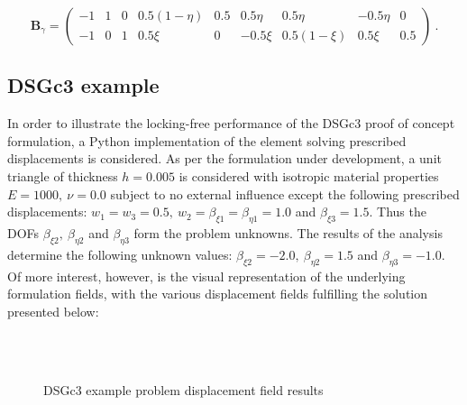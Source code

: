 \begin{equation} 
\mathbf{B}_\gamma = 
\begin{pmatrix}
-1 & 1 & 0 & 0.5(1 - \eta) & 0.5 & 0.5\eta & 0.5\eta & -0.5\eta & 0 \\
-1 & 0 & 1 & 0.5\xi & 0 & -0.5\xi & 0.5(1-\xi) & 0.5\xi & 0.5
\end{pmatrix}
\label{eqDSGc3_26}\ .
\end{equation}

\subsection{DSGc3 example}
In order to illustrate the locking-free performance of the DSGc3 proof of concept formulation, a Python implementation of the element solving prescribed displacements is considered. As per the formulation under development, a unit triangle of thickness $h = 0.005$ is considered with isotropic material properties $E = 1000,\ \nu=0.0$ subject to no external influence except the following prescribed displacements: $w_1 = w_3 = 0.5,\ w_2 = \beta_{\xi 1} = \beta_{\eta 1} = 1.0$ and $\beta_{\xi 3} = 1.5$. Thus the DOFs $\beta_{\xi 2},\ \beta_{\eta 2}$ and $\beta_{\eta 3}$ form the problem unknowns. The results of the analysis determine the following unknown values: $\beta_{\xi 2} = -2.0,\ \beta_{\eta 2} = 1.5$ and $\beta_{\eta 3} = -1.0$. Of more interest, however, is the visual representation of the underlying formulation fields, with the various displacement fields fulfilling the solution presented below:

\begin{figure}[H]
	\\
	\\
	\caption{\label{csdsgc3_result}DSGc3 example problem displacement field results}
\end{figure}

